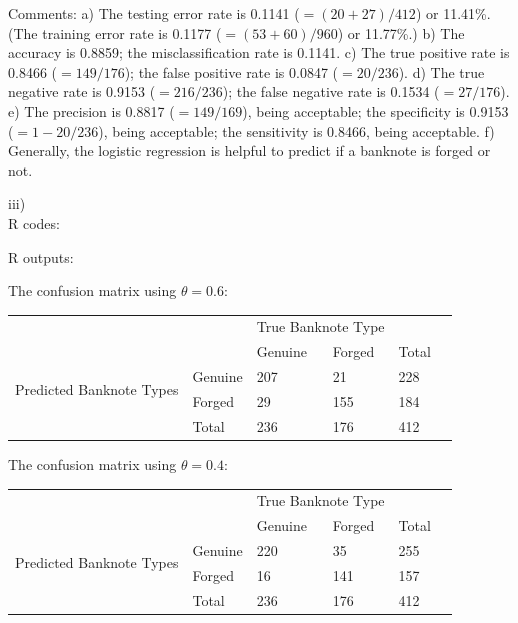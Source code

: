 \documentclass[10pt]{article}
\begin{document}
\begin{enumerate}[1)]
Comments:
\subitem
a) The testing error rate is 0.1141 ($=(20+27)/412$) or 11.41\%. (The training error rate is 0.1177 ($=(53+60)/960$) or 11.77\%.)
\subitem
b) The accuracy is 0.8859; the misclassification rate is 0.1141.
\subitem
c) The true positive rate is 0.8466 ($=149/176$); the false positive rate is 0.0847 ($=20/236$).
\subitem
d) The true negative rate is 0.9153 ($=216/236$); the false negative rate is 0.1534 ($=27/176$).
\subitem
e) The precision is 0.8817 ($=149/169$), being acceptable; the specificity is 0.9153 ($=1-20/236$), being acceptable; the sensitivity is 0.8466, being acceptable.
\subitem
f) Generally, the logistic regression is helpful to predict if a banknote is forged or not.
\vspace{3mm}

\subitem
iii)\\
R codes:

\vspace{3mm}
R outputs:

\vspace{3mm}
The confusion matrix using $\theta=0.6$:\\
\begin{tabular}{llllll}
                                          &         & \multicolumn{2}{l}{True Banknote Type} &       &  \\
                                          &         & Genuine           & Forged             & Total &  \\
\multirow{2}{*}{Predicted Banknote Types} & Genuine & 207               & 21                 & 228   &  \\
                                          & Forged  & 29                & 155                & 184   &  \\
                                          & Total   & 236               & 176                & 412   &
\end{tabular}
\vspace{3mm}

The confusion matrix using $\theta=0.4$:\\
\begin{tabular}{llllll}
                                          &         & \multicolumn{2}{l}{True Banknote Type} &       &  \\
                                          &         & Genuine           & Forged             & Total &  \\
\multirow{2}{*}{Predicted Banknote Types} & Genuine & 220               & 35                 & 255   &  \\
                                          & Forged  & 16                & 141                & 157   &  \\
                                          & Total   & 236               & 176                & 412   &
\end{tabular}
\vspace{3mm} %


\end{enumerate}
\end{document}
